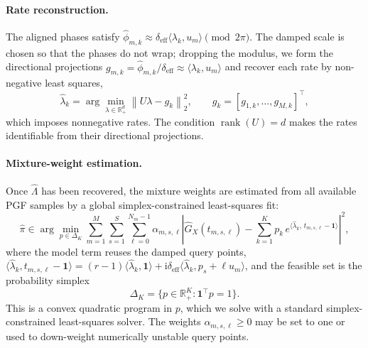\documentclass[sigconf,natbib=true,anonymous=true,review=true]{acmart}
\newcommand{\R}{\mathbb{R}}
\newcommand{\jj}{\mathrm{i}}
\newcommand{\deff}{\delta_{\mathrm{eff}}}
\begin{document}
\paragraph{Rate reconstruction.}
The aligned phases satisfy
$\widehat\phi_{m,k}\approx\deff\langle\lambda_k,u_m\rangle \pmod{2\pi}$. The damped
scale is chosen so that the phases do not wrap; dropping the modulus, we form the
directional projections $g_{m,k}=\widehat\phi_{m,k}/\deff\approx\langle\lambda_k,u_m\rangle$
and recover each rate by non-negative least squares,
\begin{equation}
    \widehat\lambda_k
    =
    \arg\min_{\lambda\in\R_+^d}
    \left\| U\lambda - g_k \right\|_2^2,
    \qquad
    g_k=[g_{1,k},\ldots,g_{M,k}]^\top,
    \label{eq:nonwrapped_ls}
\end{equation}
which imposes nonnegative rates. The condition $\operatorname{rank}(U)=d$ makes the
rates identifiable from their directional projections.

\paragraph{Mixture-weight estimation.}
Once $\widehat\Lambda$ has been recovered, the mixture weights are estimated from all
available PGF samples by a global simplex-constrained least-squares fit:
\begin{equation}
    \widehat \pi
    \in
    \arg\min_{p\in\Delta_K}
    \sum_{m=1}^M
    \sum_{s=1}^S
    \sum_{\ell=0}^{N_m-1}
    \alpha_{m,s,\ell}
    \left|
        \widehat G_X(t_{m,s,\ell})
        -
        \sum_{k=1}^K
        p_k\,
        e^{\langle \widehat\lambda_k,\, t_{m,s,\ell}-\mathbf{1}\rangle}
    \right|^2,
    \label{eq:weight_ls}
\end{equation}
where the model term reuses the damped query points,
$\langle\widehat\lambda_k,t_{m,s,\ell}-\mathbf{1}\rangle
=(r-1)\langle\widehat\lambda_k,\mathbf{1}\rangle
+\jj\deff\langle\widehat\lambda_k,p_s+\ell u_m\rangle$, and the feasible set is the
probability simplex
\[
    \Delta_K
    =
    \{p\in\R_+^K:\mathbf{1}^\top p=1\}.
\]
This is a convex quadratic program in $p$, which we solve with a standard
simplex-constrained least-squares solver.
The weights $\alpha_{m,s,\ell}\ge 0$ may be set to one or used to down-weight
numerically unstable query points.
\end{document}
